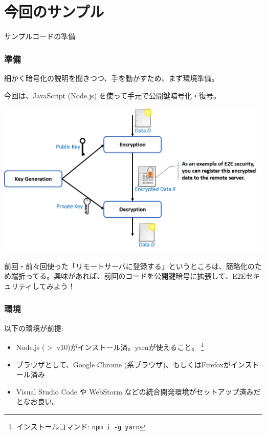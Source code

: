 \documentclass[12pt,dvipdfmx]{beamer}
\begin{document}
\section{今回のサンプル}
\begin{frame}
{\Large サンプルコードの準備}
\end{frame}

\begin{frame}
\frametitle{準備}
\small
細かく暗号化の説明を聞きつつ、手を動かすため、まず環境準備。

\alert{今回は、JavaScript (Node.js) を使って手元で公開鍵暗号化・復号。}

\begin{center}
 \includegraphics[width=0.8\linewidth]{Figs/pk-flow.png}%
\end{center}

前回・前々回使った「リモートサーバに登録する」というところは、簡略化のため端折ってる。興味があれば、前回のコードを公開鍵暗号に拡張して、E2Eセキュリティしてみよう！
\end{frame}

\begin{frame}
\frametitle{環境}
以下の環境が前提:
\begin{itemize}
 \item Node.js ($>$ v10)がインストール済。yarnが使えること。 \footnote[frame]{インストールコマンド: \texttt{npm i -g yarn}}
 \item ブラウザとして、Google Chrome (系ブラウザ)、もしくはFirefoxがインストール済み
 \item Visual Studio Code や WebStorm などの統合開発環境がセットアップ済みだとなお良い。
\end{itemize}
\end{frame}
\end{document}
